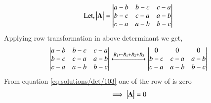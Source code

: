 \begin{align}
\rm{Let,} \begin{vmatrix}\mathbf{A}\end{vmatrix} =\begin{vmatrix}a-b & b-c & c-a \\
b-c & c-a & a-b \\
c-a & a-b & b-c\end{vmatrix} 
\end{align}
Applying row transformation in above determinant we get, 
\begin{align}
\begin{vmatrix}a-b & b-c & c-a \\
b-c & c-a & a-b \\
c-a & a-b & b-c\end{vmatrix} \xleftrightarrow[]{R_1\leftarrow R_1+R_2+R_3} \begin{vmatrix}0 & 0 & 0 \\
b-c & c-a & a-b \\
c-a & a-b & b-c\end{vmatrix} 
\label{eq:solutions/det/103}
\end{align}
From equation \eqref{eq:solutions/det/103} one of the row of  is zero
\begin{align}
\implies \begin{vmatrix}\mathbf{A}\end{vmatrix} = 0
\end{align}


